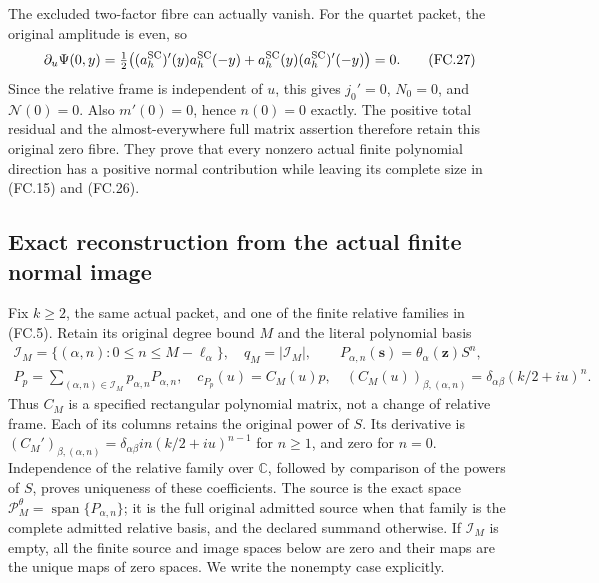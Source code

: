 The excluded two-factor fibre can actually vanish. For the quartet
packet, the original amplitude is even, so
\[
 \partial_u\Psi(0,y)=\tfrac12\bigl(
 (a_h^{\rm SC})'(y)a_h^{\rm SC}(-y)
 +a_h^{\rm SC}(y)(a_h^{\rm SC})'(-y)\bigr)=0.
 \tag{FC.27}
\]
Since the relative frame is independent of \(u\), this gives
\(j_0'=0\), \(N_0=0\), and \(\mathcal N(0)=0\).
Also \(m'(0)=0\), hence \(n(0)=0\) exactly. The positive
total residual and the almost-everywhere full matrix assertion
therefore retain this original zero fibre. They prove that every
nonzero actual finite polynomial direction has a positive normal
contribution while leaving its complete size in (FC.15) and (FC.26).

\subsection{Exact reconstruction from the actual finite normal image}

Fix \(k\ge2\), the same actual packet, and one of the finite
relative families in (FC.5). Retain its original degree bound \(M\)
and the literal polynomial basis
\[
 \begin{gathered}
 \mathcal I_M=\{(\alpha,n):0\le n\le M-\ell_\alpha\},
 \quad q_M=|\mathcal I_M|,\qquad
 P_{\alpha,n}(\mathbf s)=\theta_\alpha(\mathbf z)S^n,\\
 P_p=\sum_{(\alpha,n)\in\mathcal I_M}p_{\alpha,n}P_{\alpha,n},
 \quad c_{P_p}(u)=C_M(u)p,
 \quad (C_M(u))_{\beta,(\alpha,n)}
       =\delta_{\alpha\beta}(k/2+iu)^n.
 \end{gathered}
 \tag{FC.28}
\]
Thus \(C_M\) is a specified rectangular polynomial matrix, not a
change of relative frame. Each of its columns retains the original
power of \(S\). Its derivative is
\((C_M')_{\beta,(\alpha,n)}=
\delta_{\alpha\beta}in(k/2+iu)^{n-1}\) for \(n\ge1\),
and zero for \(n=0\). Independence of the relative family over
\(\mathbb C\), followed by comparison of the powers of \(S\),
proves uniqueness of these coefficients. The source is the exact
space \(\mathcal P_M^\theta=\operatorname{span}\{P_{\alpha,n}\}\);
it is the full original admitted source when that family is the
complete admitted relative basis, and the declared summand otherwise.
If \(\mathcal I_M\) is empty, all the finite source and image
spaces below are zero and their maps are the unique maps of zero
spaces. We write the nonempty case explicitly.

